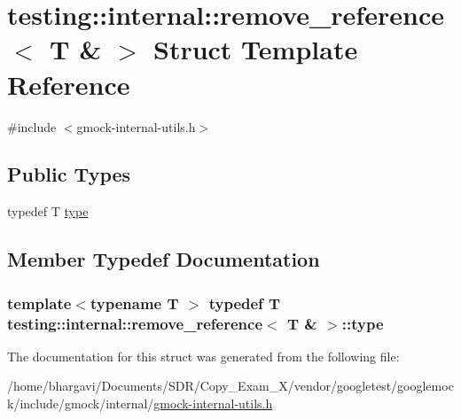 \hypertarget{structtesting_1_1internal_1_1remove__reference_3_01_t_01_6_01_4}{}\section{testing\+:\+:internal\+:\+:remove\+\_\+reference$<$ T \& $>$ Struct Template Reference}
\label{structtesting_1_1internal_1_1remove__reference_3_01_t_01_6_01_4}


{\ttfamily \#include $<$gmock-\/internal-\/utils.\+h$>$}

\subsection*{Public Types}
\begin{DoxyCompactItemize}
\item 
typedef T \hyperlink{structtesting_1_1internal_1_1remove__reference_3_01_t_01_6_01_4_a0d72f004f54016a47c752a82be352a19}{type}
\end{DoxyCompactItemize}


\subsection{Member Typedef Documentation}
\subsubsection[{\texorpdfstring{type}{type}}]{\setlength{\rightskip}{0pt plus 5cm}template$<$typename T $>$ typedef T {\bf testing\+::internal\+::remove\+\_\+reference}$<$ T \& $>$\+::{\bf type}}\hypertarget{structtesting_1_1internal_1_1remove__reference_3_01_t_01_6_01_4_a0d72f004f54016a47c752a82be352a19}{}\label{structtesting_1_1internal_1_1remove__reference_3_01_t_01_6_01_4_a0d72f004f54016a47c752a82be352a19}


The documentation for this struct was generated from the following file\+:\begin{DoxyCompactItemize}
\item 
/home/bhargavi/\+Documents/\+S\+D\+R/\+Copy\+\_\+\+Exam\+\_\+X/vendor/googletest/googlemock/include/gmock/internal/\hyperlink{gmock-internal-utils_8h}{gmock-\/internal-\/utils.\+h}\end{DoxyCompactItemize}
